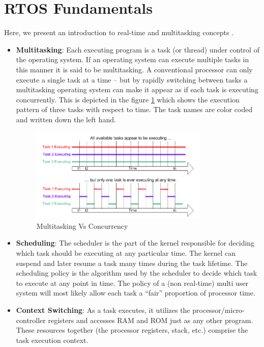 \documentclass[12pt]{report}
\begin{document}
\section{RTOS Fundamentals}
 Here, we present an introduction to real-time and multitasking concepts \cite{rtos-funda}.
 \begin{itemize}
     \item \textbf{Multitasking}: Each executing program is a task (or thread) under control of the operating system. If an operating system can execute multiple tasks in this manner it is said to be multitasking. A conventional processor can only execute a single task at a time -- but by rapidly switching between tasks a multitasking operating system can make it appear as if each task is executing concurrently. This is depicted in the figure \ref{fig:multitasking} which shows the execution pattern of three tasks with respect to time. The task names are color coded and written down the left hand.
     \begin{figure}[h]
    \centering
    \includegraphics[width=0.8\textwidth]{images/multitasking.png}
    \caption{Multitasking Vs Concurrency}
    \label{fig:multitasking}
    \end{figure}
     \item \textbf{Scheduling}: The scheduler is the part of the kernel responsible for deciding which task should be executing at any particular time. The kernel can suspend and later resume a task many times during the task lifetime. The scheduling policy is the algorithm used by the scheduler to decide which task to execute at any point in time. The policy of a (non real-time) multi user system will most likely allow each task a “fair” proportion of processor time. 
     \item \textbf{Context Switching}: As a task executes, it utilizes the processor/micro-controller registers and accesses RAM and ROM just as any other program. These resources together (the processor registers, stack, etc.) comprise the task execution context. 
     

\end{itemize}
\end{document}

